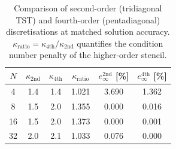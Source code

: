 \begin{table}[htbp]
  \centering
  \caption{Comparison of second-order (tridiagonal TST) and fourth-order (pentadiagonal) discretisations at matched solution accuracy. $\kappa_\mathrm{ratio} = \kappa_\mathrm{4th} / \kappa_\mathrm{2nd}$ quantifies the condition number penalty of the higher-order stencil.}
  \label{tab:order_comparison}
  \begin{tabular}{S[table-format=2.0] S[table-format=4.1] S[table-format=4.1] S[table-format=1.3] S[table-format=3.3] S[table-format=3.3]}
    \toprule
    {$N$} & {$\kappa_\mathrm{2nd}$} & {$\kappa_\mathrm{4th}$} & {$\kappa_\mathrm{ratio}$} & {$e_\infty^\mathrm{2nd}$ [\%]} & {$e_\infty^\mathrm{4th}$ [\%]} \\
     & 1.4 & 1.4 & 1.021 & 3.690 & 1.362 \\
    8 & 1.5 & 2.0 & 1.355 & 0.000 & 0.016 \\
    16 & 1.5 & 2.0 & 1.373 & 0.000 & 0.001 \\
    32 & 2.0 & 2.1 & 1.033 & 0.076 & 0.000 \\
    \bottomrule
  \end{tabular}
\end{table}
